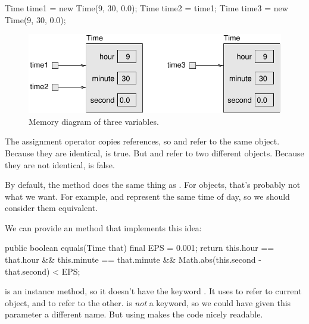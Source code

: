 \begin{code}
Time time1 = new Time(9, 30, 0.0);
Time time2 = time1;
Time time3 = new Time(9, 30, 0.0);
\end{code}


\begin{figure}[!ht]
\begin{center}
\includegraphics{figs/time2.pdf}
\caption{Memory diagram of three  variables.}
\label{fig.time2}
\end{center}
\end{figure}

The assignment operator copies references, so  and  refer to the same object.
Because they are identical,  is true.
But  and  refer to two different objects.
Because they are not identical,  is false.

By default, the  method does the same thing as \java{==}.
For  objects, that's probably not what we want.
For example,  and  represent the same time of day, so we should consider them equivalent.


We can provide an  method that implements this idea:

\begin{code}
public boolean equals(Time that) {
    final EPS = 0.001;
    return this.hour == that.hour
        && this.minute == that.minute
        && Math.abs(this.second - that.second) < EPS;
}
\end{code}

 is an instance method, so it doesn't have the keyword .
It uses  to refer to current object, and  to refer to the other.
 is {\em not} a keyword, so we could have given this parameter a different name.
But using  makes the code nicely readable. 

